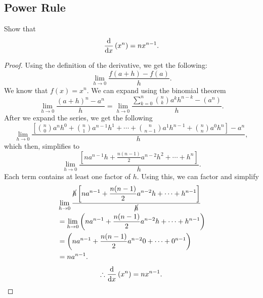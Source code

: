 \subsection{Power Rule}

Show that
\[%
  \odv{}{x}\left(x^{n}\right) = nx^{n - 1}
.\]%

\begin{proof}
  Using the definition of the derivative, we get the following:
  \[%
    \lim_{h \to 0} \frac{f(a + h) - f(a)}{h}
  .\]%
  We know that $f(x) = x^{n}$. We can expand using the binomial theorem
  \[%
    \lim_{h \to 0} \frac{\displaystyle(a + h)^{n} - a^{n}}{\displaystyle h} = \lim_{h \to 0} \frac{\displaystyle\sum_{k=0}^{n} {n \choose k} a^{k}h^{n - k} - \left(a^{n}\right)}{\displaystyle h}
  .\]%
  After we expand the series, we get the following
  \[%
    \lim_{h \to 0} \frac{\displaystyle\left[{n \choose 0} a^{n}h^{0} + {n \choose 1} a^{n-1}h^{1} + \cdots + {n \choose n-1} a^{1}h^{n-1} + {n \choose n} a^{0}h^{n}\right] - a^{n}}{\displaystyle h}
  ,\]%
  which then, simplifies to
  \[%
    \lim_{h \to 0} \frac{\displaystyle\left[na^{n-1}h + \frac{n(n-1)}{2}a^{n-2}h^{2} + \cdots + h^{n}\right]}{\displaystyle h}
  .\]%
  Each term contains at least one factor of $h$. Using this,
  we can factor and simplify
  \begin{align*}
    &\lim_{h \to 0} \frac{\displaystyle\cancel{h}\left[na^{n-1} + \frac{n(n-1)}{2}a^{n-2}h + \cdots + h^{n-1}\right]}{\cancel{\displaystyle h}} \\
    &= \lim_{h \to 0} \left(na^{n-1} + \frac{n(n-1)}{2}a^{n-2}h + \cdots + h^{n-1} \right) \\
    &= \left(na^{n-1} + \frac{n(n-1)}{2}a^{n-2}0 + \cdots + 0^{n-1}\right) \\
    &= na^{n-1}
  .\end{align*}
  \[%
    \therefore \odv{}{x}\left(x^{n}\right) = nx^{n-1}
  .\]%
\end{proof}
